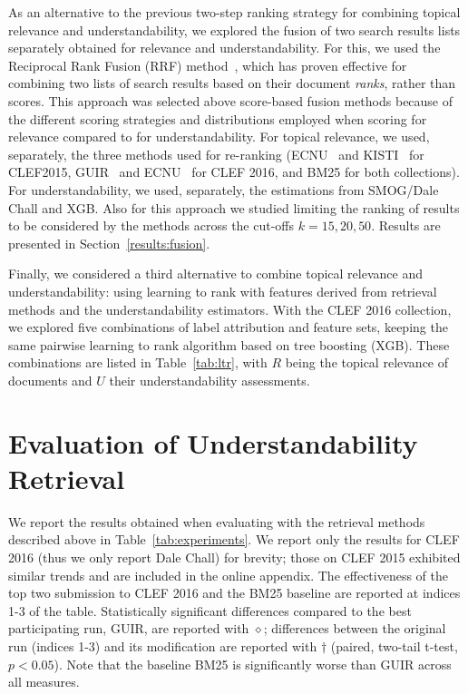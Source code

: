 As an alternative to the previous two-step ranking strategy for combining topical relevance and understandability, we explored the fusion of two search results lists separately obtained for relevance and understandability. For this, we used the Reciprocal Rank Fusion (RRF) method~\cite{cormack09}, which has proven effective for combining two lists of search results based on their document \textit{ranks}, rather than scores. This approach was selected above score-based fusion methods because of the different scoring strategies and distributions employed when scoring for relevance compared to for understandability. For topical relevance, we used, separately, the three methods used for re-ranking (ECNU~\cite{song15} and KISTI~\cite{oh15} for CLEF2015, GUIR~\cite{soldaini16} and ECNU~\cite{song16} for CLEF 2016, and BM25 for both collections). For understandability, we used, separately, the estimations from SMOG/Dale Chall and XGB. Also for this approach we studied limiting the ranking of results to be considered by the methods across the cut-offs $k=15, 20, 50$. Results are presented in Section~\ref{results:fusion}.


Finally, we considered a third alternative to combine topical relevance and understandability: using learning to rank with features derived from retrieval methods and the understandability estimators.
With the CLEF 2016 collection, we explored five combinations of label attribution and feature sets, keeping the same pairwise learning to rank algorithm based on tree boosting (XGB).
These combinations are listed in Table~\ref{tab:ltr}, with $R$ being the topical relevance of documents and $U$ their understandability assessments. 



\vspace{-10pt}
\section{Evaluation of Understandability Retrieval}
\label{sec:results}




We report the results obtained when evaluating with the retrieval methods described above in Table~\ref{tab:experiments}. We report only the results for CLEF 2016 (thus we only report Dale Chall) for brevity; those on CLEF 2015 exhibited similar trends and are included in the online appendix. The effectiveness of the top two submission to CLEF 2016 and the BM25 baseline are reported at indices 1-3 of the table. Statistically significant differences compared to the best participating run, GUIR, are reported with $\diamond$; differences between the original run (indices 1-3) and its modification are reported with $\dagger$ (paired, two-tail t-test, $p<0.05$). Note that the baseline BM25 is significantly worse than GUIR across all measures. 

